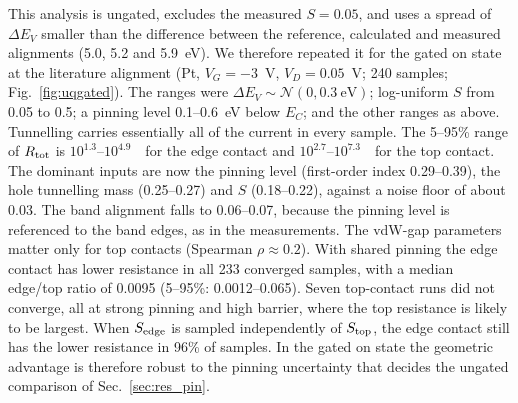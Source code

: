 This analysis is ungated, excludes the measured $S=0.05$, and uses a spread of $\Delta E_V$ smaller than the difference between the reference, calculated and measured alignments (5.0, 5.2 and 5.9~eV). We therefore repeated it for the gated on state at the literature alignment (Pt, $V_G=-3$~V, $V_D=0.05$~V; 240 samples; Fig.~\ref{fig:uqgated}). The ranges were $\Delta E_V\sim\mathcal N(0,0.3~\mathrm{eV})$; log-uniform $S$ from 0.05 to 0.5; a pinning level 0.1--0.6~eV below $E_C$; and the other ranges as above. Tunnelling carries essentially all of the current in every sample. The 5--95\% range of $R_{\rm tot}$ is $10^{1.3}$--$10^{4.9}$~\ohmcm\ for the edge contact and $10^{2.7}$--$10^{7.3}$~\ohmcm\ for the top contact. The dominant inputs are now the pinning level (first-order index 0.29--0.39), the hole tunnelling mass (0.25--0.27) and $S$ (0.18--0.22), against a noise floor of about 0.03. The band alignment falls to 0.06--0.07, because the pinning level is referenced to the band edges, as in the measurements. The vdW-gap parameters matter only for top contacts (Spearman $\rho\approx0.2$). With shared pinning the edge contact has lower resistance in all 233 converged samples, with a median edge/top ratio of 0.0095 (5--95\%: 0.0012--0.065). Seven top-contact runs did not converge, all at strong pinning and high barrier, where the top resistance is likely to be largest. When $S_{\rm edge}$ is sampled independently of $S_{\rm top}$, the edge contact still has the lower resistance in 96\% of samples. In the gated on state the geometric advantage is therefore robust to the pinning uncertainty that decides the ungated comparison of Sec.~\ref{sec:res_pin}.
